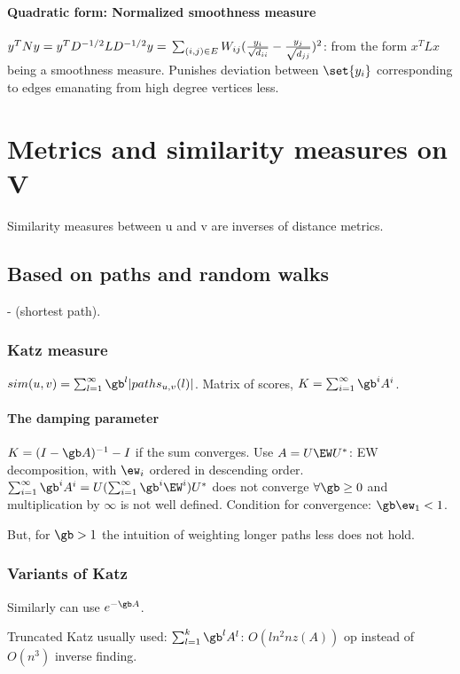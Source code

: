 \documentclass[oneside, article]{memoir}
\begin{document}
\subsubsection{Quadratic form: Normalized smoothness measure}
$y^{T}Ny = y^{T}D^{-1/2}LD^{-1/2}y = \\
\sum_{(i, j)\in E}W_{ij}(\frac{y_i}{\sqrt{d_{ii}}} - \frac{y_j}{\sqrt{d_{jj}}})^2$: from the form $x^{T}Lx$ being a smoothness measure. Punishes deviation between $\set{y_i}$ corresponding to edges emanating from high degree vertices less.

\chapter{Metrics and similarity measures on V}
Similarity measures between u and v are inverses of distance metrics.

\section{Based on paths and random walks}
- (shortest path).

\subsection{Katz measure}
 $sim(u,v) = \sum_{l=1}^{\infty} \gb^{l}|paths_{u,v}(l)|$. Matrix of scores, $K = \sum_{i=1}^{\infty} \gb^{i}A^{i}$.

\subsubsection{The damping parameter}
$K = (I - \gb A)^{-1} - I$ if the sum converges. Use $A = U\EW U^{*}$: EW decomposition, with $\ew_{i}$ ordered in descending order. $\sum_{i=1}^{\infty} \gb^{i}A^{i} = U(\sum_{i=1}^{\infty} \gb^{i}\EW^{i})U^{*}$ does not converge $\forall \gb \geq 0$ and multiplication by $\infty$ is not well defined. Condition for convergence: $\gb \ew_{1} < 1$.

But, for $\gb > 1$ the intuition of weighting longer paths less does not hold.

\subsection{Variants of Katz}
Similarly can use $e^{-\gb A}$.

Truncated Katz usually used: $\sum_{l=1}^{k} \gb^{l}A^{l}$: $O(ln^{2}nz(A))$ op instead of $O(n^{3})$ inverse finding.
\end{document}
